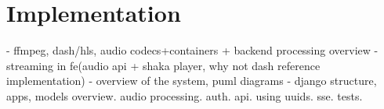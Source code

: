 \chapter{Implementation}\label{chap:implementation}

- ffmpeg, dash/hls, audio codecs+containers + backend processing overview
- streaming in fe(audio api + shaka player, why not dash reference implementation)
- overview of the system, puml diagrams
- django structure, apps, models overview. audio processing. auth. api. using uuids. sse. tests.
